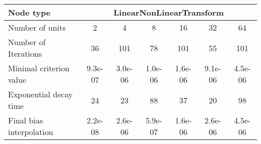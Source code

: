 \begin{tabular}{l|cccccc|}
Node type & \multicolumn{6}{c}{LinearNonLinearTransform} \\
\hline
Number of units & 2 & 4 & 8 & 16 & 32 & 64 \\
Number of Iterations & 36 & 101 & 78 & 101 & 55 & 101 \\
Minimal criterion value & 9.3e-07 & 3.0e-06 & 1.0e-06 &  1.6e-06 & 9.1e-06 & 4.5e-06 \\
Exponential decay time & 24 & 23 & 88 &  37 &  20 &  98 \\
Final bias interpolation & 2.2e-08 & 2.6e-06 & 5.9e-07 & 1.6e-06 & 2.6e-06 & 4.5e-06 \\
\hline
\end{tabular}
